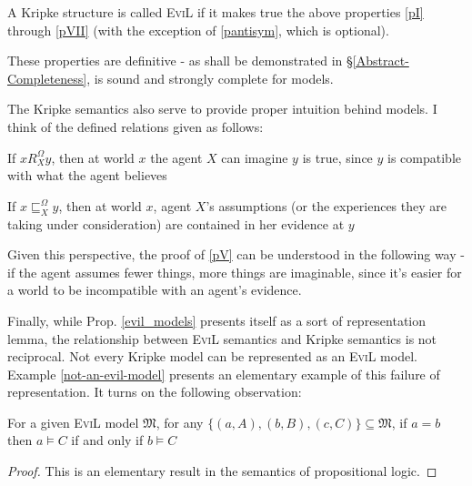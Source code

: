 \begin{definition}
A Kripke structure is called \textsc{EviL} if it makes true the
  above properties \ref{pI} through \ref{pVII} (with the exception of \ref{pantisym}, which is optional).
\end{definition}

These properties are definitive - as shall be demonstrated in \S\ref{Abstract-Completeness},  is
sound and strongly complete for  models.

The Kripke semantics also serve to provide proper intuition behind
 models. I think of the defined relations given as follows:
\begin{itemizedot}
  \item If $x R^{\Omega}_X y$, then at world $x$ the agent $X$ can imagine $y$
  is true, since $y$ is compatible with what the agent believes 
  \item If $x \sqsubseteq^{\Omega}_X y$, then at world $x$, agent $X$'s
  assumptions (or the experiences they are taking under consideration) are
  contained in her evidence at $y$
\end{itemizedot}
Given this perspective, the proof of \ref{pV} can be understood in the
following way - if the agent assumes fewer things, more things are imaginable,
since it's easier for a world to be incompatible with an agent's evidence.

Finally, while Prop. \ref{evil_models} presents itself as a sort of
representation lemma, the relationship between \textsc{EviL} semantics
and Kripke semantics is not reciprocal.  Not every Kripke model can be
represented as an \textsc{EviL} model.  Example
\ref{not-an-evil-model} presents an elementary example of 
this failure of representation.  It turns on the following
observation:

\begin{lemma}
  For a given \textsc{EviL} model $\mathfrak{M}$, for any
  $\{(a,A),(b,B),(c,C)\} \subseteq \mathfrak{M}$, if $a = b$ then $a
  \models C$ if and only if $b \models C$
\end{lemma}
\begin{proof}
  This is an elementary result in the semantics of propositional logic.
\end{proof}

